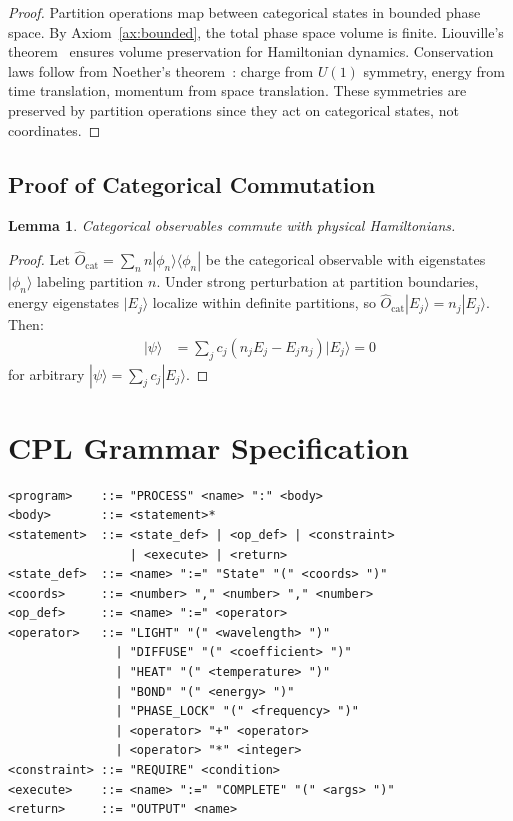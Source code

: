\documentclass[aps,prd,twocolumn,superscriptaddress,floatfix,nofootinbib]{revtex4-2}
\newtheorem{lemma}[theorem]{Lemma}
\theoremstyle{remark}
\begin{document}
\begin{proof}
Partition operations map between categorical states in bounded phase space. By Axiom~\ref{ax:bounded}, the total phase space volume is finite. Liouville's theorem~\cite{liouville1838} ensures volume preservation for Hamiltonian dynamics. Conservation laws follow from Noether's theorem~\cite{noether1918}: charge from $U(1)$ symmetry, energy from time translation, momentum from space translation. These symmetries are preserved by partition operations since they act on categorical states, not coordinates.
\end{proof}

\subsection{Proof of Categorical Commutation}

\begin{lemma}
Categorical observables commute with physical Hamiltonians.
\end{lemma}

\begin{proof}
Let $\hat{O}_{\text{cat}} = \sum_n n|\phi_n\rangle\langle\phi_n|$ be the categorical observable with eigenstates $|\phi_n\rangle$ labeling partition $n$. Under strong perturbation at partition boundaries, energy eigenstates $|E_j\rangle$ localize within definite partitions, so $\hat{O}_{\text{cat}}|E_j\rangle = n_j|E_j\rangle$. Then:
\begin{align}
[\hat{O}_{\text{cat}}, \hat{H}]|\psi\rangle &= \sum_j c_j(n_j E_j - E_j n_j)|E_j\rangle = 0
\end{align}
for arbitrary $|\psi\rangle = \sum_j c_j|E_j\rangle$.
\end{proof}

\section{CPL Grammar Specification}
\label{app:grammar}

\begin{verbatim}
<program>    ::= "PROCESS" <name> ":" <body>
<body>       ::= <statement>*
<statement>  ::= <state_def> | <op_def> | <constraint>
                 | <execute> | <return>
<state_def>  ::= <name> ":=" "State" "(" <coords> ")"
<coords>     ::= <number> "," <number> "," <number>
<op_def>     ::= <name> ":=" <operator>
<operator>   ::= "LIGHT" "(" <wavelength> ")"
               | "DIFFUSE" "(" <coefficient> ")"
               | "HEAT" "(" <temperature> ")"
               | "BOND" "(" <energy> ")"
               | "PHASE_LOCK" "(" <frequency> ")"
               | <operator> "+" <operator>
               | <operator> "*" <integer>
<constraint> ::= "REQUIRE" <condition>
<execute>    ::= <name> ":=" "COMPLETE" "(" <args> ")"
<return>     ::= "OUTPUT" <name>
\end{verbatim}
\end{document}
